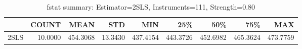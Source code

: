 \begin{table}[ht]
\centering
\caption{fstat summary: Estimator=2SLS, Instruments=111, Strength=0.80}
\begin{tabular}{lrrrrrrrr}
\toprule
 & COUNT & MEAN & STD & MIN & 25\% & 50\% & 75\% & MAX \\
\midrule
2SLS & 10.0000 & 454.3068 & 13.3430 & 437.4154 & 443.3726 & 452.6982 & 465.3624 & 473.7759 \\
\bottomrule
\end{tabular}
\end{table}
